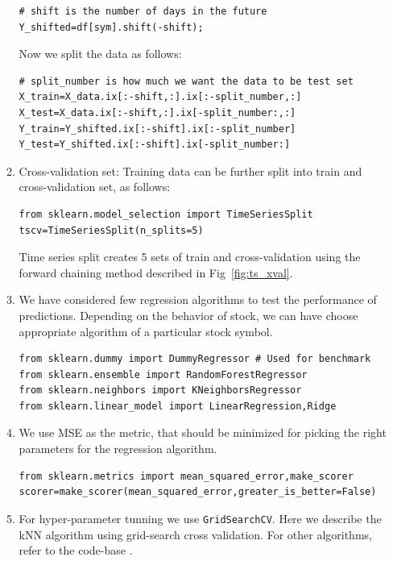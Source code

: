 \documentclass[12pt]{article}
\begin{document}
\begin{itemize}
\begin{enumerate}
\begin{verbatim}
# shift is the number of days in the future
Y_shifted=df[sym].shift(-shift);
\end{verbatim}

Now we split the data as follows:
\begin{verbatim}
# split_number is how much we want the data to be test set  
X_train=X_data.ix[:-shift,:].ix[:-split_number,:]
X_test=X_data.ix[:-shift,:].ix[-split_number:,:] 
Y_train=Y_shifted.ix[:-shift].ix[:-split_number]
Y_test=Y_shifted.ix[:-shift].ix[-split_number:]
\end{verbatim}

\item Cross-validation set: Training data can be further split into train and cross-validation set, as follows:

\begin{verbatim}
from sklearn.model_selection import TimeSeriesSplit
tscv=TimeSeriesSplit(n_splits=5)
\end{verbatim}

Time series split creates 5 sets of train and cross-validation using the forward chaining method described in Fig~\ref{fig:ts_xval}.

\item We have considered few regression algorithms to test the performance of predictions. Depending on the behavior of stock, we can have choose appropriate algorithm of a particular stock symbol.

\begin{verbatim}
from sklearn.dummy import DummyRegressor # Used for benchmark
from sklearn.ensemble import RandomForestRegressor
from sklearn.neighbors import KNeighborsRegressor
from sklearn.linear_model import LinearRegression,Ridge
\end{verbatim}

\item We use MSE as the metric, that should be minimized for picking the right parameters for the regression algorithm.

\begin{verbatim}
from sklearn.metrics import mean_squared_error,make_scorer
scorer=make_scorer(mean_squared_error,greater_is_better=False)
\end{verbatim}

\item For hyper-parameter tunning we use \texttt{GridSearchCV}. Here we describe the kNN algorithm using grid-search cross validation. For other algorithms, refer to the code-base \cite{sc}.


\end{enumerate}
\end{itemize}
\end{document}
